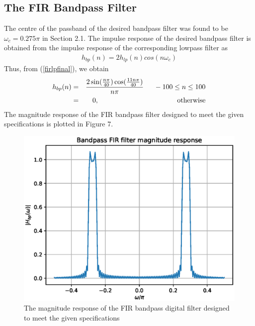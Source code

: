 \documentclass{article}
\begin{document}
\subsection{The FIR Bandpass Filter}
The centre of the passband of the desired bandpass filter was found to be $\omega_c = 0.275\pi$ in Section
2.1.  The impulse response of the desired bandpass filter is obtained from the impulse response of the
corresponding lowpass filter as
\begin{eqnarray}
h_{bp}(n) = 2h_{lp}(n)cos(n\omega_c)
\end{eqnarray}
Thus, from (\ref{firlpfinal}), we obtain
\begin{eqnarray}
\label{firbpfinal}
h_{bp}(n) &=& \frac{2\sin(\frac{n\pi}{40}) \cos(\frac{11n\pi}{40})}{n\pi} \indent -100 \leq n \leq 100 \nonumber \\
&=& 0, \hspace{4cm} \mbox{otherwise}
\end{eqnarray}
%
The magnitude response of the FIR bandpass filter designed to meet the given specifications is plotted in Figure 7.
\begin{figure}
\label{fig7}
\includegraphics[width = 15cm]{./codes/fir/figs/ee18btech11012_FIR_Bandpass.eps}
\caption{The magnitude response of the FIR bandpass digital filter designed to meet the given specifications} 
\end{figure}
\end{document}
